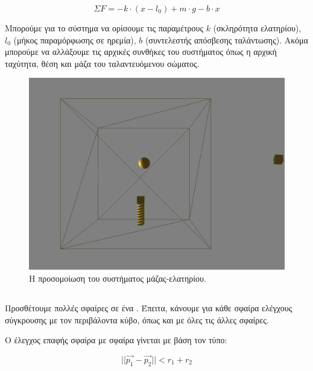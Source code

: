 \documentclass[11pt]{scrartcl} %
\begin{document}
\begin{equation}
	\Sigma F = -k \cdot (x - l_0) + m \cdot g - b \cdot x	
\end{equation}

Μπορούμε για το σύστημα να ορίσουμε τις παραμέτρους $k$ (σκληρότητα ελατηρίου), $l_0$ (μήκος παραμόρφωσης σε ηρεμία), 
$b$ (συντελεστής απόσβεσης ταλάντωσης).
Ακόμα μπορούμε να αλλάξουμε τις αρχικές συνθήκες του συστήματος όπως η αρχική ταχύτητα, θέση και μάζα του ταλαντευόμενου σώματος.

\begin{figure}[H]
	\begin{center}
		\includegraphics[height=.5\textheight]{./assets/spring.png}
	\end{center}
	\caption{Η προσομοίωση του συστήματος μάζας-ελατηρίου.}
\end{figure}

\subsection{}

Προσθέτουμε πολλές σφαίρες σε ένα . Έπειτα, κάνουμε για κάθε σφαίρα ελέγχους σύγκρουσης με τον περιβάλοντα κύβο, όπως
και με όλες τις άλλες σφαίρες. 

Ο έλεγχος επαφής σφαίρα με σφαίρα γίνεται με βάση τον τύπο: 

\begin{equation}
	||\vec{p_1} - \vec{p_2}|| < r_1 + r_2
\end{equation}
\end{document}
